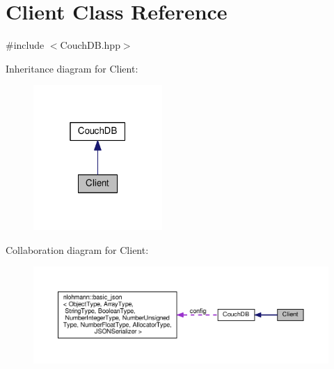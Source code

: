 \hypertarget{class_client}{}\section{Client Class Reference}
\label{class_client}


{\ttfamily \#include $<$Couch\+D\+B.\+hpp$>$}



Inheritance diagram for Client\+:\nopagebreak
\begin{figure}[H]
\begin{center}
\leavevmode
\includegraphics[width=139pt]{class_client__inherit__graph}
\end{center}
\end{figure}


Collaboration diagram for Client\+:\nopagebreak
\begin{figure}[H]
\begin{center}
\leavevmode
\includegraphics[width=350pt]{class_client__coll__graph}
\end{center}
\end{figure}
